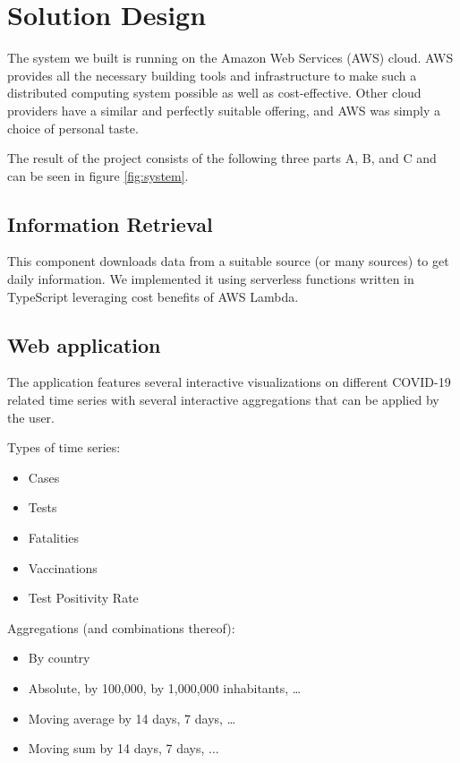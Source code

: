 \newpage
\section{Solution Design}

The system we built is running on the Amazon Web Services (AWS) cloud. AWS provides all the necessary building tools and infrastructure to make such a distributed computing system possible as well as cost-effective. Other cloud providers have a similar and perfectly suitable offering, and AWS was simply a choice of personal taste.

The result of the project consists of the following three parts A, B, and C and can be seen in figure \ref{fig:system}.

\subsection{Information Retrieval}
This component downloads data from a suitable source (or many sources) to get daily information. We implemented it using serverless functions written in TypeScript leveraging cost benefits of AWS Lambda.

\subsection{Web application}
The application features several interactive visualizations on different COVID-19 related time series with several interactive aggregations that can be applied by the user. 

Types of time series:

\begin{itemize}
    \item Cases
    \item Tests
    \item Fatalities
    \item Vaccinations
    \item Test Positivity Rate
\end{itemize}

Aggregations (and combinations thereof):
\begin{itemize}
    \item By country
    \item Absolute, by 100,000, by 1,000,000 inhabitants, …
    \item Moving average by 14 days, 7 days, …
    \item Moving sum by 14 days, 7 days, ...
\end{itemize}

